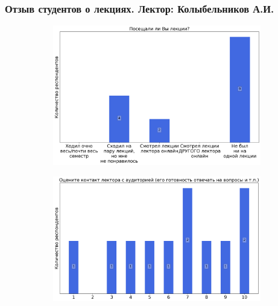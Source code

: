 	\subsubsection{Отзыв студентов о лекциях. Лектор: Колыбельников А.И.}
		\begin{figure}[H]
			\centering
            \begin{subfigure}[b]{0.45\textwidth}
				\centering
				\includegraphics[width=\textwidth]{images/4 course/Защита информации/lecturer-questions-Колыбельников А.И.-0.png}
			\end{subfigure}
			\begin{subfigure}[b]{0.45\textwidth}
				\centering
				\includegraphics[width=\textwidth]{images/4 course/Защита информации/lecturer-marks-Колыбельников А.И.-0.png}
			\end{subfigure}
			\begin{subfigure}[b]{0.45\textwidth}
				\centering

\end{subfigure}
\end{figure}
